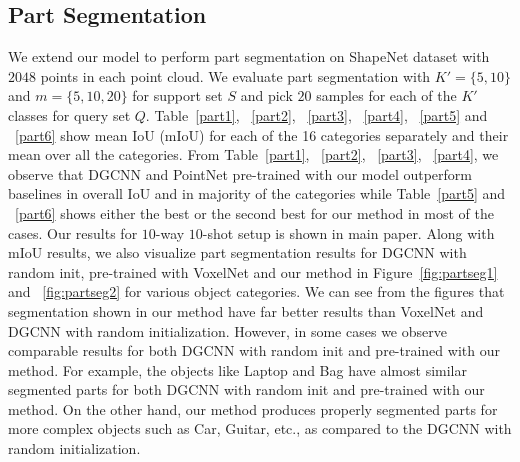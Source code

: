 \documentclass{article}
\begin{document}
\subsection{Part Segmentation}
We extend our model to perform part segmentation on ShapeNet dataset with $2048$ points in each point cloud. We evaluate part segmentation with $K'=\{5,10\}$ and $m=\{5,10,20\}$ for support set $S$ and pick $20$ samples for each of the $K'$ classes for query set $Q$. Table~\ref{part1}, ~\ref{part2}, ~\ref{part3}, ~\ref{part4}, ~\ref{part5} and ~\ref{part6} show mean IoU (mIoU) for each of the 16 categories separately and their mean over all the categories. From Table~\ref{part1}, ~\ref{part2}, ~\ref{part3}, ~\ref{part4}, we observe that DGCNN and PointNet pre-trained with our model outperform baselines in overall IoU and in majority of the categories while Table~\ref{part5} and ~\ref{part6} shows either the best or the second best for our method in most of the cases. Our results for $10$-way $10$-shot setup is shown in main paper. Along with mIoU results, we also visualize part segmentation results for DGCNN with random init, pre-trained with VoxelNet and our method in Figure~\ref{fig:partseg1} and ~\ref{fig:partseg2} for various object categories. We can see from the figures that segmentation shown in our method have far better results than VoxelNet and DGCNN with random initialization. However, in some cases we observe comparable results for both DGCNN with random init and pre-trained with our method. For example, the objects like Laptop and Bag have almost similar segmented parts for both DGCNN with random init and pre-trained with our method. On the other hand, our method produces properly segmented parts for more complex objects such as Car, Guitar, etc., as compared to the DGCNN with random initialization.
\end{document}
